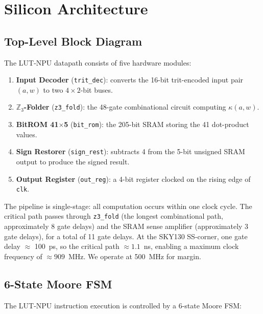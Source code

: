 \section{Silicon Architecture}
\label{sec:silicon}

\subsection{Top-Level Block Diagram}
\label{subsec:top_level}

The LUT-NPU datapath consists of five hardware modules:

\begin{enumerate}
  \item \textbf{Input Decoder} (\texttt{trit\_dec}): converts the 16-bit
        trit-encoded input pair \((a,w)\) to two \(4 \times 2\)-bit
        buses.
  \item \textbf{\(\mathbb{Z}_3\)-Folder} (\texttt{z3\_fold}): the
        48-gate combinational circuit computing \(\kappa(a,w)\).
  \item \textbf{BitROM 41$\times$5} (\texttt{bit\_rom}): the 205-bit
        SRAM storing the 41 dot-product values.
  \item \textbf{Sign Restorer} (\texttt{sign\_rest}): subtracts 4 from
        the 5-bit unsigned SRAM output to produce the signed result.
  \item \textbf{Output Register} (\texttt{out\_reg}): a 4-bit register
        clocked on the rising edge of \texttt{clk}.
\end{enumerate}

The pipeline is single-stage: all computation occurs within one clock
cycle.  The critical path passes through \texttt{z3\_fold} (the longest
combinational path, approximately 8 gate delays) and the SRAM sense
amplifier (approximately 3 gate delays), for a total of 11 gate delays.
At the SKY130 SS-corner, one gate delay \(\approx\) 100~ps, so the
critical path \(\approx 1.1\)~ns, enabling a maximum clock frequency of
\(\approx 909\)~MHz.  We operate at 500~MHz for margin.

\subsection{6-State Moore FSM}
\label{subsec:fsm}

The LUT-NPU instruction execution is controlled by a 6-state Moore
FSM:

